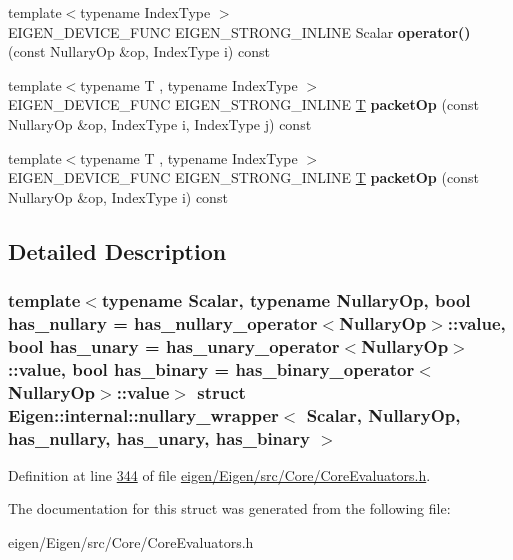 \begin{DoxyCompactItemize}
\item 
\mbox{\label{struct_eigen_1_1internal_1_1nullary__wrapper_afbfc90f531bf32d3da1a870cc8e65907}} 
{\footnotesize template$<$typename Index\+Type $>$ }\\E\+I\+G\+E\+N\+\_\+\+D\+E\+V\+I\+C\+E\+\_\+\+F\+U\+NC E\+I\+G\+E\+N\+\_\+\+S\+T\+R\+O\+N\+G\+\_\+\+I\+N\+L\+I\+NE Scalar {\bfseries operator()} (const Nullary\+Op \&op, Index\+Type i) const
\item 
\mbox{\label{struct_eigen_1_1internal_1_1nullary__wrapper_a7d18d3aaa762c89aa3750732914815fe}} 
{\footnotesize template$<$typename T , typename Index\+Type $>$ }\\E\+I\+G\+E\+N\+\_\+\+D\+E\+V\+I\+C\+E\+\_\+\+F\+U\+NC E\+I\+G\+E\+N\+\_\+\+S\+T\+R\+O\+N\+G\+\_\+\+I\+N\+L\+I\+NE \hyperlink{group___sparse_core___module}{T} {\bfseries packet\+Op} (const Nullary\+Op \&op, Index\+Type i, Index\+Type j) const
\item 
\mbox{\label{struct_eigen_1_1internal_1_1nullary__wrapper_a0a79344800b51bab99b99f8eb0ee3498}} 
{\footnotesize template$<$typename T , typename Index\+Type $>$ }\\E\+I\+G\+E\+N\+\_\+\+D\+E\+V\+I\+C\+E\+\_\+\+F\+U\+NC E\+I\+G\+E\+N\+\_\+\+S\+T\+R\+O\+N\+G\+\_\+\+I\+N\+L\+I\+NE \hyperlink{group___sparse_core___module}{T} {\bfseries packet\+Op} (const Nullary\+Op \&op, Index\+Type i) const
\end{DoxyCompactItemize}


\subsection{Detailed Description}
\subsubsection*{template$<$typename Scalar, typename Nullary\+Op, bool has\+\_\+nullary = has\+\_\+nullary\+\_\+operator$<$\+Nullary\+Op$>$\+::value, bool has\+\_\+unary = has\+\_\+unary\+\_\+operator$<$\+Nullary\+Op$>$\+::value, bool has\+\_\+binary = has\+\_\+binary\+\_\+operator$<$\+Nullary\+Op$>$\+::value$>$\newline
struct Eigen\+::internal\+::nullary\+\_\+wrapper$<$ Scalar, Nullary\+Op, has\+\_\+nullary, has\+\_\+unary, has\+\_\+binary $>$}



Definition at line \hyperlink{eigen_2_eigen_2src_2_core_2_core_evaluators_8h_source_l00344}{344} of file \hyperlink{eigen_2_eigen_2src_2_core_2_core_evaluators_8h_source}{eigen/\+Eigen/src/\+Core/\+Core\+Evaluators.\+h}.



The documentation for this struct was generated from the following file\+:\begin{DoxyCompactItemize}
\item 
eigen/\+Eigen/src/\+Core/\+Core\+Evaluators.\+h\end{DoxyCompactItemize}
